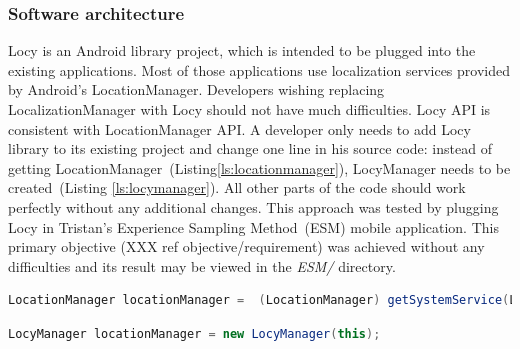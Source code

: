 \subsubsection{Software architecture}
\label{s:design:locy:architecture}
\hspace{10pt}Locy is an Android library project, which is intended to be plugged into the existing applications. Most of those applications use localization services provided by Android's LocationManager. Developers wishing replacing LocalizationManager with Locy should not have much difficulties. Locy API is consistent with LocationManager API. A developer only needs to add Locy library to its existing project and change one line in his source code: instead of getting LocationManager\ (Listing\ref{ls:locationmanager}), LocyManager needs to be created\ (Listing \ref{ls:locymanager}). All other parts of the code should work perfectly without any additional changes. This approach was tested by plugging Locy in Tristan's Experience Sampling Method\ (ESM) mobile application. This primary objective (XXX ref objective/requirement) was achieved without any difficulties and its result may be viewed in the \textit{ESM/} directory.

                 
\begin{lstlisting}[language=Java,
       basicstyle=\ttfamily,
       keywordstyle=\color{blue}\ttfamily,
       stringstyle=\color{red}\ttfamily,
       commentstyle=\color{green}\ttfamily,
      breaklines=true,
      frame=single,    
      label=ls:locationmanager,caption=Localization services with LocationManager.]
LocationManager locationManager =  (LocationManager) getSystemService(LOCATION_SERVICE);
\end{lstlisting}
\begin{lstlisting}[language=Java,
       basicstyle=\ttfamily,
       keywordstyle=\color{blue}\ttfamily,
       stringstyle=\color{red}\ttfamily,
       commentstyle=\color{green}\ttfamily,
      breaklines=true,
      frame=single,    
      label=ls:locymanager,caption=Localization services with LocyManager.]
LocyManager locationManager = new LocyManager(this);
\end{lstlisting}

